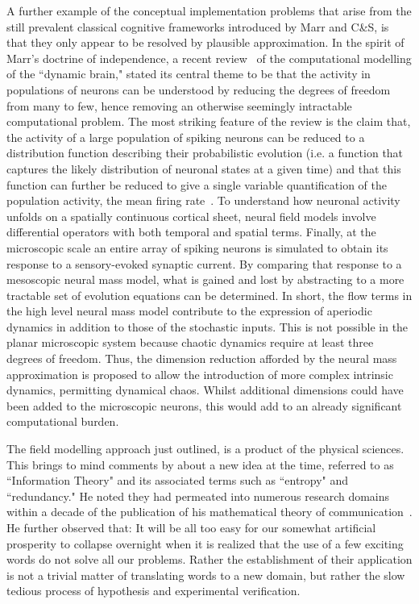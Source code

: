 \documentclass[11pt,3p,twocolumn]{JMN}
\begin{document}
A further example of the conceptual implementation problems that arise from the still prevalent classical cognitive frameworks introduced by Marr and C\&S, is that they only appear to be resolved by plausible approximation. In the spirit of Marr's doctrine of independence, a recent review~\citep{deco08} of the computational modelling of the ``dynamic brain," stated its central theme to be that the activity in populations of neurons can be understood by reducing the degrees of freedom from many to few, hence removing an otherwise seemingly intractable computational problem. The most striking feature of the review is the claim that, the activity of a large population of spiking neurons can be reduced to a distribution function describing their probabilistic evolution (i.e. a function that captures the likely distribution of neuronal states at a given time) and that this function can further be reduced to give a single variable quantification of the population activity, the mean firing rate~\citep{deco08}. To understand how neuronal activity unfolds on a spatially continuous cortical sheet, neural field models involve differential operators with both temporal and spatial terms. Finally, at the microscopic scale an entire array of spiking neurons is simulated to obtain its response to a sensory-evoked synaptic current. By comparing that response to a mesoscopic neural mass model, what is gained and lost by abstracting to a more tractable set of evolution equations can be determined. In short, the flow terms in the high level neural mass model contribute to the expression of aperiodic dynamics in addition to those of the stochastic inputs. This is not possible in the planar microscopic system because chaotic dynamics require at least three degrees of freedom. Thus, the dimension reduction afforded by the neural mass approximation is proposed to allow the introduction of more complex intrinsic dynamics, permitting dynamical chaos. Whilst additional dimensions could have been added to the microscopic neurons, this would add to an already significant computational burden.

The field modelling approach just outlined, is a product of the physical sciences. This brings to mind comments by \citet{shannon56} about a new idea at the time, referred to as ``Information Theory" and its associated terms such as ``entropy" and ``redundancy." He noted they had permeated into numerous research domains within a decade of the publication of his mathematical theory of communication~\citep{shannon48}. He further observed that: It will be all too easy for our somewhat artificial prosperity to collapse overnight when it is realized that the use of a few exciting words do not solve all our problems. Rather the establishment of their application is not a trivial matter of translating words to a new domain, but rather the slow tedious process of hypothesis and experimental verification.
\end{document}
